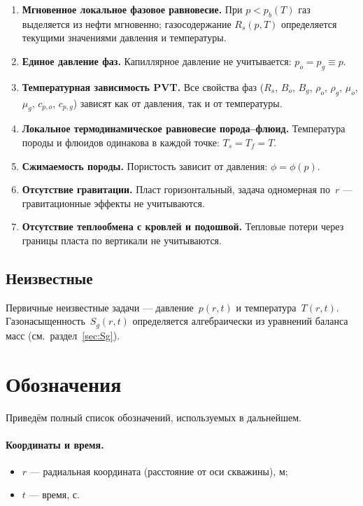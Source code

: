 \documentclass[12pt,a4paper]{article}
\begin{document}
\begin{enumerate}[label=\arabic*., nosep]
  \item \textbf{Мгновенное локальное фазовое равновесие.}
        При $p < p_b(T)$ газ выделяется из нефти мгновенно; газосодержание
        $R_s(p,T)$ определяется текущими значениями давления и температуры.
  \item \textbf{Единое давление фаз.}
        Капиллярное давление не учитывается: $p_o = p_g \equiv p$.
  \item \textbf{Температурная зависимость PVT.}
        Все свойства фаз ($R_s$, $B_o$, $B_g$, $\rho_o$, $\rho_g$,
        $\mu_o$, $\mu_g$, $c_{p,o}$, $c_{p,g}$) зависят как от давления,
        так и от температуры.
  \item \textbf{Локальное термодинамическое равновесие порода--флюид.}
        Температура породы и флюидов одинакова в каждой точке: $T_s = T_f = T$.
  \item \textbf{Сжимаемость породы.}
        Пористость зависит от давления: $\phi = \phi(p)$.
  \item \textbf{Отсутствие гравитации.}
        Пласт горизонтальный, задача одномерная по~$r$ --- гравитационные
        эффекты не учитываются.
  \item \textbf{Отсутствие теплообмена с кровлей и подошвой.}
        Тепловые потери через границы пласта по вертикали не учитываются.
\end{enumerate}

\subsection{Неизвестные}\label{ssec:unknowns}

Первичные неизвестные задачи --- давление~$p(r,t)$ и температура~$T(r,t)$.
Газонасыщенность~$S_g(r,t)$ определяется алгебраически из уравнений
баланса масс (см.~раздел~\ref{sec:Sg}).


\section{Обозначения}\label{sec:notation}

Приведём полный список обозначений, используемых в дальнейшем.

\paragraph{Координаты и время.}
\begin{itemize}[nosep]
  \item $r$ --- радиальная координата (расстояние от оси скважины), м;
  \item $t$ --- время, с.
\end{itemize}
\end{document}
